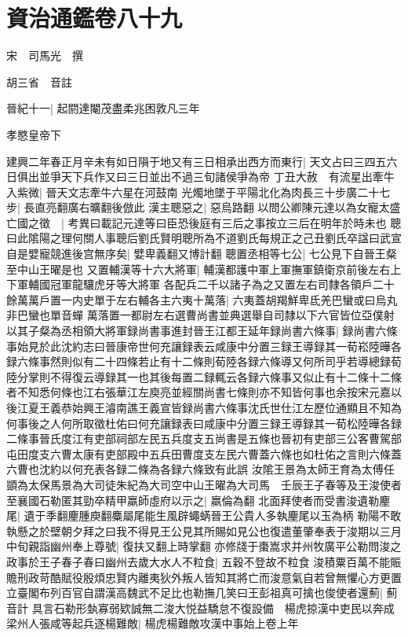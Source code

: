 \section{資治通鑑卷八十九}
宋　司馬光　撰

胡三省　音註

晉紀十一|{
	起閼達閹茂盡柔兆困敦凡三年}


孝愍皇帝下

建興二年春正月辛未有如日隕于地又有三日相承出西方而東行|{
	天文占曰三四五六日俱出並爭天下兵作又曰三日並出不過三旬諸侯爭為帝}
丁丑大赦　有流星出牽牛入紫微|{
	晉天文志牽牛六星在河鼓南}
光燭地墜于平陽北化為肉長三十步廣二十七步|{
	長直亮翻廣右曠翻後倣此}
漢主聰惡之|{
	惡烏路翻}
以問公卿陳元達以為女寵太盛亡國之徵　|{
	考異曰載記元達等曰臣恐後庭有三后之事按立三后在明年於時未也}
聰曰此隂陽之理何關人事聰后劉氏賢明聰所為不道劉氏每規正之己丑劉氏卒諡曰武宣自是嬖寵競進後宫無序矣|{
	嬖卑義翻又博計翻}
聰置丞相等七公|{
	七公見下自晉王粲至中山王曜是也}
又置輔漢等十六大將軍|{
	輔漢都護中軍上軍撫軍鎮衛京前後左右上下軍輔國冠軍龍驤虎牙等大將軍}
各配兵二千以諸子為之又置左右司隸各領戶二十餘萬萬戶置一内史單于左右輔各主六夷十萬落|{
	六夷蓋胡羯鮮卑氐羌巴蠻或曰烏丸非巴蠻也單音蟬}
萬落置一都尉左右選曹尚書並典選舉自司隸以下六官皆位亞僕射以其子粲為丞相領大將軍録尚書事進封晉王江都王延年録尚書六條事|{
	録尚書六條事始見於此沈約志曰晉康帝世何充讓録表云咸康中分置三録王導録其一荀崧陸曄各録六條事然則似有二十四條若止有十二條則荀陸各録六條導又何所司乎若導總録荀陸分掌則不得復云導録其一也其後每置二録輒云各録六條事又似止有十二條十二條者不知悉何條也江右張華江左庾亮並經關尚書七條則亦不知皆何事也余按宋元嘉以後江夏王義恭始興王濬南譙王義宣皆録尚書六條事沈氏世仕江左歷位通顯且不知為何事後之人何所取徵杜佑曰何充讓録表曰咸康中分置三録王導録其一荀松陸曄各録二條事晉氏度江有吏部祠部左民五兵度支五尚書是五條也晉初有吏部三公客曹駕部屯田度支六曹太康有吏部殿中五兵田曹度支左民六曹蓋六條也如杜佑之言則六條蓋六曹也沈約以何充表各録二條為各録六條致有此誤}
汝隂王景為太師王育為太傅任顗為太保馬景為大司徒朱紀為大司空中山王曜為大司馬　壬辰王子春等及王浚使者至襄國石勒匿其勁卒精甲羸師虛府以示之|{
	羸倫為翻}
北面拜使者而受書浚遺勒麈尾|{
	遺于季翻麈腫庾翻麋屬尾能生風辟蠅蜹晉王公貴人多執麈尾以玉為柄}
勒陽不敢執懸之於壁朝夕拜之曰我不得見王公見其所賜如見公也復遣董肇奉表于浚期以三月中旬親詣幽州奉上尊號|{
	復扶又翻上時掌翻}
亦修牋于棗嵩求并州牧廣平公勒問浚之政事於王子春子春曰幽州去歲大水人不粒食|{
	五穀不登故不粒食}
浚積粟百萬不能賑贍刑政苛酷賦役殷煩忠賢内離夷狄外叛人皆知其將亡而浚意氣自若曾無懼心方更置立臺閣布列百官自謂漢高魏武不足比也勒撫几笑曰王彭祖真可擒也俊使者還薊|{
	薊音計}
具言石勒形埶寡弱欵誠無二浚大悦益驕怠不復設備　楊虎掠漢中吏民以奔成梁州人張咸等起兵逐楊難敵|{
	楊虎楊難敵攻漢中事始上卷上年}
